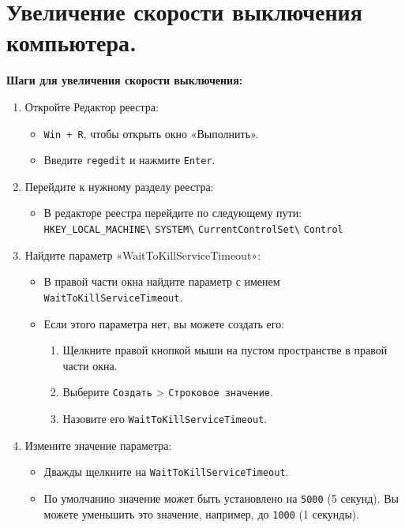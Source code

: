\documentclass[a4paper, 14pt]{report}
\begin{document}
\section{Увеличение скорости выключения компьютера.}
\textbf{Шаги для увеличения скорости выключения:}
\begin{enumerate}
    \item {Откройте Редактор реестра:
          \begin{itemize}
              \item \verb|Win + R|, чтобы открыть окно «Выполнить».
              \item Введите \verb|regedit| и нажмите \verb|Enter|.
          \end{itemize}
          }
    \item {Перейдите к нужному разделу реестра:
          \begin{itemize}
              \item В редакторе реестра перейдите по следующему пути:\\ \verb|HKEY_LOCAL_MACHINE\|
                    \verb|SYSTEM\|
                    \verb|CurrentControlSet\|
                    \verb|Control|
          \end{itemize}
          }
    \item {Найдите параметр «WaitToKillServiceTimeout»:
          \begin{itemize}
              \item В правой части окна найдите параметр с именем \verb|WaitToKillServiceTimeout|.
              \item {Если этого параметра нет, вы можете создать его:
                    \begin{enumerate}
                        \item Щелкните правой кнопкой мыши на пустом пространстве в правой части окна.
                        \item Выберите \verb|Создать| > \verb|Строковое значение|.
                        \item Назовите его \verb|WaitToKillServiceTimeout|.
                    \end{enumerate}
                    }
          \end{itemize}
          }
    \item {Измените значение параметра:
          \begin{itemize}
              \item Дважды щелкните на \verb|WaitToKillServiceTimeout|.
              \item По умолчанию значение может быть установлено на \verb|5000| (5 секунд). Вы можете уменьшить это значение, например, до \verb|1000| (1 секунды).

\end{itemize}}
\end{enumerate}
\end{document}
